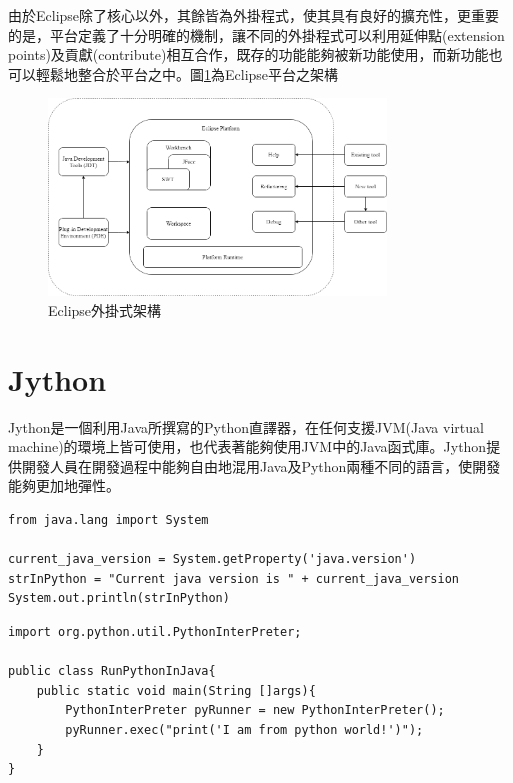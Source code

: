 \indent
由於Eclipse除了核心以外，其餘皆為外掛程式，使其具有良好的擴充性，更重要的是，平台定義了十分明確的機制，讓不同的外掛程式可以利用延伸點(extension points)及貢獻(contribute)相互合作，既存的功能能夠被新功能使用，而新功能也可以輕鬆地整合於平台之中。圖\ref{f2.6}為Eclipse平台之架構\cite{EclipseStructure}

\begin{figure}[H]
    \centering
    \includegraphics[width=0.8\textwidth]{picture/eclipse_structure.png}
    \caption{Eclipse外掛式架構\cite{EclipseStructure}}
    \label{f2.6}
\end{figure}

\newpage
\section{Jython}
\indent
Jython\cite{Jython}是一個利用Java所撰寫的Python直譯器，在任何支援JVM\cite{JVM}(Java virtual machine)的環境上皆可使用，也代表著能夠使用JVM中的Java函式庫。Jython提供開發人員在開發過程中能夠自由地混用Java及Python兩種不同的語言，使開發能夠更加地彈性。

\begin{lstlisting}[caption=Jython於Python語言環境中執行Java之實例, label={l2.4}]
from java.lang import System

current_java_version = System.getProperty('java.version')
strInPython = "Current java version is " + current_java_version
System.out.println(strInPython)
\end{lstlisting}

\begin{lstlisting}[caption=Jython於Java語言環境中執行Python之實例, label={l2.5}]
import org.python.util.PythonInterPreter;

public class RunPythonInJava{
    public static void main(String []args){
        PythonInterPreter pyRunner = new PythonInterPreter();
		pyRunner.exec("print('I am from python world!')");
	}
}
\end{lstlisting}